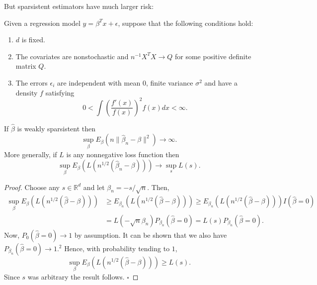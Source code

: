   But sparsistent estimators have much larger risk:

  \begin{theorem}
    Given a regression model $y = \beta^T x + \epsilon$, suppose that the following conditions hold:
    \begin{enumerate}
      \item $d$ is fixed.
      
      \item The covariates are nonstochastic and $n^{-1}X^T X \to Q$ for some positive definite matrix $Q$.
      
      \item The errors $\epsilon_i$ are independent with mean $0$, finite variance $\sigma^2$ and have a density $f$ satisfying
      \begin{equation}
        0 < \int \left( \frac{f'(x)}{f(x)} \right)^2 f(x) dx < \infty.
      \end{equation}
    \end{enumerate}
    If $\hat{\beta}$ is weakly sparsistent then
    \begin{equation}
      \sup_{\beta} E_{\beta}(n\|\hat{\beta}_n - \beta\|^2) \to \infty. 
    \end{equation}
    More generally, if $L$ is any nonnegative loss function then
    \begin{equation}
      \sup_{\beta} E_{\beta}(L(n^{1/2}(\hat{\beta}_n - \beta))) \to \sup_s L(s). 
    \end{equation}
  \end{theorem}
  \begin{proof}
    Choose any $s \in \mathbb{R}^d$ and let $\beta_n = -s/\sqrt{n}$. Then,
    \begin{align}
      \sup_{\beta} E_{\beta}(L(n^{1/2}(\hat{\beta} - \beta))) &\geq E_{\beta_n}(L(n^{1/2}(\hat{\beta} - \beta))) \geq E_{\beta_n}(L(n^{1/2}(\hat{\beta} - \beta))) I(\hat{\beta} = 0) \\
      &= L(-\sqrt{n}\beta_n) P_{\beta_n}(\hat{\beta} = 0) = L(s) P_{\beta_n}(\hat{\beta} = 0).
    \end{align}
    Now, $P_0(\hat{\beta} = 0) \to 1$ by assumption. It can be shown that we also have $P_{\beta_n}(\hat{\beta} = 0) \to 1.^2$ Hence, with probability tending to $1$,
    \begin{equation}
      \sup_{\beta} E_{\beta}(L(n^{1/2}(\hat{\beta} - \beta))) \geq L(s).
    \end{equation}
    Since $s$ was arbitrary the result follows. $\square$
  \end{proof}
